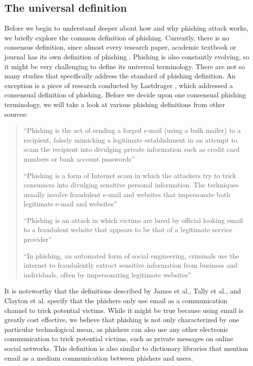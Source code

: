 \subsection{The universal definition }

Before we begin to understand deeper about how and why phishing attack
works, we briefly explore the common definition of phishing. Currently,
there is no consensus definition, since almost every research paper,
academic textbook or journal has its own definition of phishing \citep{jakobsson:2006,james:2005,tally:2004,clayton:2005,parno:2006,jakobsson:2005,dhamija2006phishing}.
Phishing is also constantly evolving, so it might be very challenging
to define its universal terminology. There are not so many studies
that specifically address the standard of phishing definition. An
exception is a piece of research conducted by Lastdrager \citep{lastdrager:2014},
which addressed a consensual definition of phishing. Before we decide
upon one consensual phishing terminology, we will take a look at various
phishing definitions from other sources:
\begin{quote}
``Phishing is the act of sending a forged e-mail (using a bulk mailer)
to a recipient, falsely mimicking a legitimate establishment in an
attempt to scam the recipient into divulging private information such
as credit card numbers or bank account passwords'' \citep{james:2005}

``Phishing is a form of Internet scam in which the attackers try
to trick consumers into divulging sensitive personal information.
The techniques usually involve fraudulent e-mail and websites that
impersonate both legitimate e-mail and websites'' \citep{tally:2004}

``Phishing is an attack in which victims are lured by official looking
email to a fraudulent website that appears to be that of a legitimate
service provider'' \citep{clayton:2005}

``In phishing, an automated form of social engineering, criminals
use the internet to fraudulently extract sensitive information from
business and individuals, often by impersonating legitimate websites''
\citep{parno:2006}
\end{quote}
It is noteworthy that the definitions described by James et al., Tally
et al., and Clayton et al. \citep{james:2005,tally:2004,clayton:2005}
specify that the phishers only use email as a communication channel
to trick potential victims. While it might be true because using email
is greatly cost effective, we believe that phishing is not only characterized
by one particular technological mean, as phishers can also use any
other electronic communication to trick potential victims, such as
private messages on online social networks. This definition is also
similar to dictionary libraries \citep{oxford,collins,merriam} that
mention email as a medium communication between phishers and users.

